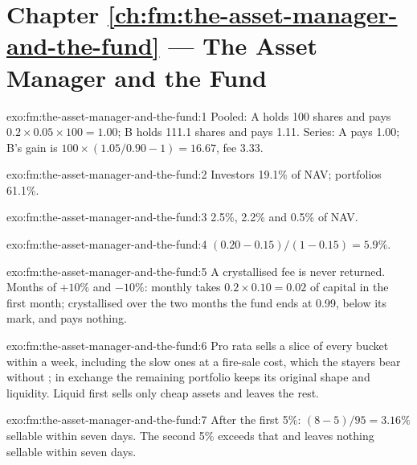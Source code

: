 \section*{Chapter \ref{ch:fm:the-asset-manager-and-the-fund} --- The Asset Manager and the Fund}

\begin{solution}{exo:fm:the-asset-manager-and-the-fund:1}
Pooled: A holds 100 shares and pays $0.2\times0.05\times100=1.00$; B holds 111.1 shares and pays 1.11. Series: A pays 1.00; B's gain is
$100\times(1.05/0.90-1)=16.67$, fee 3.33.
\end{solution}

\begin{solution}{exo:fm:the-asset-manager-and-the-fund:2}
Investors 19.1\% of NAV; portfolios 61.1\%.
\end{solution}

\begin{solution}{exo:fm:the-asset-manager-and-the-fund:3}
2.5\%, 2.2\% and 0.5\% of NAV.
\end{solution}

\begin{solution}{exo:fm:the-asset-manager-and-the-fund:4}
$(0.20-0.15)/(1-0.15)=5.9\%$.
\end{solution}

\begin{solution}{exo:fm:the-asset-manager-and-the-fund:5}
A crystallised fee is never returned. Months of $+10\%$ and $-10\%$: monthly  takes $0.2\times0.10=0.02$ of capital in the first
month; crystallised over the two months the fund ends at 0.99, below its mark, and pays nothing.
\end{solution}

\begin{solution}{exo:fm:the-asset-manager-and-the-fund:6}
Pro rata sells a slice of every bucket within a week, including the slow ones at a fire-sale cost, which the stayers bear without ;
in exchange the remaining portfolio keeps its original shape and liquidity. Liquid first sells only cheap assets and leaves the rest.
\end{solution}

\begin{solution}{exo:fm:the-asset-manager-and-the-fund:7}
After the first 5\%: $(8-5)/95=3.16\%$ sellable within seven days. The second 5\% exceeds that and leaves nothing sellable within seven days.
\end{solution}


